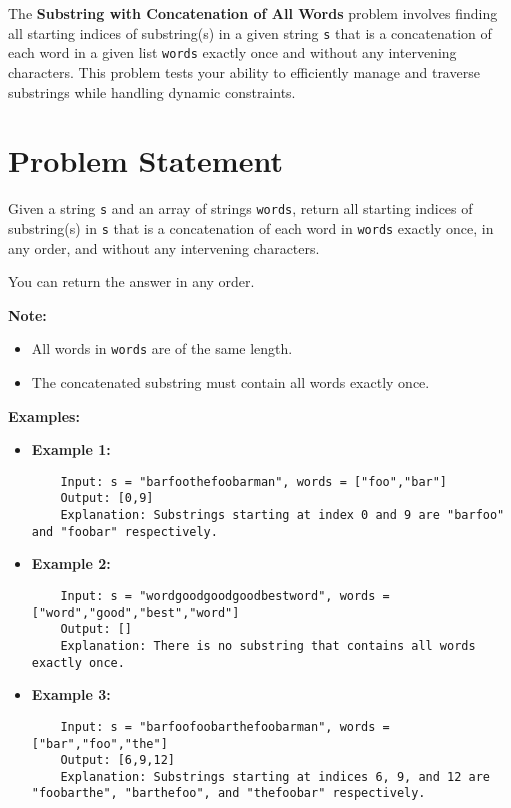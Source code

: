 
\label{chap:substring_with_concatenation_of_all_words}

The \textbf{Substring with Concatenation of All Words} problem involves finding all starting indices of substring(s) in a given string \texttt{s} that is a concatenation of each word in a given list \texttt{words} exactly once and without any intervening characters. This problem tests your ability to efficiently manage and traverse substrings while handling dynamic constraints.

\section*{Problem Statement}

Given a string \texttt{s} and an array of strings \texttt{words}, return all starting indices of substring(s) in \texttt{s} that is a concatenation of each word in \texttt{words} exactly once, in any order, and without any intervening characters.

You can return the answer in any order.

\textbf{Note:}
\begin{itemize}
    \item All words in \texttt{words} are of the same length.
    \item The concatenated substring must contain all words exactly once.
\end{itemize}

\textbf{Examples:}

\begin{itemize}
    \item \textbf{Example 1:}
    \begin{verbatim}
    Input: s = "barfoothefoobarman", words = ["foo","bar"]
    Output: [0,9]
    Explanation: Substrings starting at index 0 and 9 are "barfoo" and "foobar" respectively.
    \end{verbatim}

    \item \textbf{Example 2:}
    \begin{verbatim}
    Input: s = "wordgoodgoodgoodbestword", words = ["word","good","best","word"]
    Output: []
    Explanation: There is no substring that contains all words exactly once.
    \end{verbatim}

    \item \textbf{Example 3:}
    \begin{verbatim}
    Input: s = "barfoofoobarthefoobarman", words = ["bar","foo","the"]
    Output: [6,9,12]
    Explanation: Substrings starting at indices 6, 9, and 12 are "foobarthe", "barthefoo", and "thefoobar" respectively.
    \end{verbatim}
\end{itemize}


